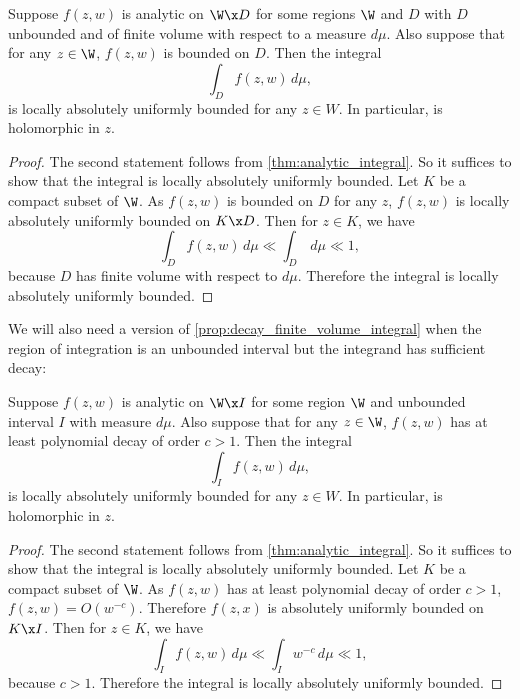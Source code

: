         \begin{proposition}\label{prop:decay_finite_volume_integral}
          Suppose $f(z,w)$ is analytic on $\W \x D$ for some regions $\W$ and $D$ with $D$ unbounded and of finite volume with respect to a measure $d\mu$. Also suppose that for any $z \in \W$, $f(z,w)$ is bounded on $D$. Then the integral
          \[
            \int_{D}f(z,w)\,d\mu,
          \]
          is locally absolutely uniformly bounded for any $z \in W$. In particular, is holomorphic in $z$.
        \end{proposition}
        \begin{proof}
          The second statement follows from \cref{thm:analytic_integral}. So it suffices to show that the integral is locally absolutely uniformly bounded. Let $K$ be a compact subset of $\W$. As $f(z,w)$ is bounded on $D$ for any $z$, $f(z,w)$ is locally absolutely uniformly bounded on $K \x D$. Then for $z \in K$, we have
          \[
            \int_{D}f(z,w)\,d\mu \ll \int_{D}\,d\mu \ll 1, 
          \]
          because $D$ has finite volume with respect to $d\mu$. Therefore the integral is locally absolutely uniformly bounded. 
        \end{proof}

        We will also need a version of \cref{prop:decay_finite_volume_integral} when the region of integration is an unbounded interval but the integrand has sufficient decay:

        \begin{proposition}\label{prop:decay_unbounded_inteval_integral}
          Suppose $f(z,w)$ is analytic on $\W \x I$ for some region $\W$ and unbounded interval $I$ with measure $d\mu$. Also suppose that for any $z \in \W$, $f(z,w)$ has at least polynomial decay of order $c > 1$. Then the integral
          \[
            \int_{I}f(z,w)\,d\mu,
          \]
          is locally absolutely uniformly bounded for any $z \in W$. In particular, is holomorphic in $z$.
        \end{proposition}
        \begin{proof}
          The second statement follows from \cref{thm:analytic_integral}. So it suffices to show that the integral is locally absolutely uniformly bounded. Let $K$ be a compact subset of $\W$. As $f(z,w)$ has at least polynomial decay of order $c > 1$, $f(z,w) = O(w^{-c})$. Therefore $f(z,x)$ is absolutely uniformly bounded on $K \x I$. Then for $z \in K$, we have
          \[
            \int_{I}f(z,w)\,d\mu \ll \int_{I}w^{-c}\,d\mu \ll 1, 
          \]
          because $c > 1$. Therefore the integral is locally absolutely uniformly bounded. 
        \end{proof}

